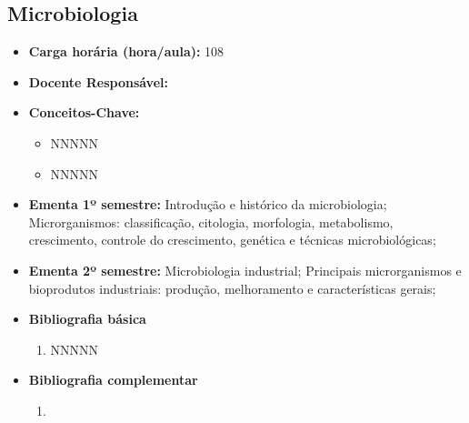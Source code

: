 \documentclass[11pt,fleqn]{book} %
\begin{document}
\subsection{Microbiologia}\label{disc:microbiologia}
\begin{itemize}
	\item \textbf{Carga horária (hora/aula):} 108
	\item \textbf{Docente Responsável:}
	\item \textbf{Conceitos-Chave:}
	\begin{itemize}
		\item NNNNN
		\item NNNNN
	\end{itemize}
	\item \textbf{Ementa 1º semestre:}
	Introdução e histórico da microbiologia; 
	Microrganismos: classificação, citologia, morfologia, metabolismo, crescimento, controle do crescimento, genética e técnicas microbiológicas;
	\item \textbf{Ementa 2º semestre:}
	Microbiologia industrial; 
	Principais microrganismos e bioprodutos industriais: produção, melhoramento e características gerais;	
	\item \textbf{Bibliografia básica}
	\begin{enumerate}
		\item NNNNN
	\end{enumerate}
	\item \textbf{Bibliografia complementar}
	\begin{enumerate}
		\item 
	\end{enumerate}	
\end{itemize}


\newpage
\end{document}
